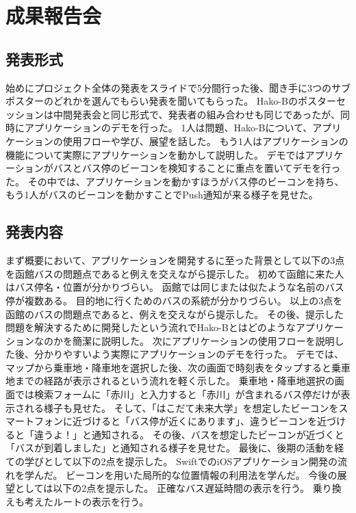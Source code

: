 \documentclass[openany,11pt,papersize]{jsbook}
\begin{document}

\section{成果報告会}
\subsection{発表形式}
始めにプロジェクト全体の発表をスライドで5分間行った後、聞き手に3つのサブポスターのどれかを選んでもらい発表を聞いてもらった。
Hako-Bのポスターセッションは中間発表会と同じ形式で、発表者の組み合わせも同じであったが、同時にアプリケーションのデモを行った。
1人は問題、Hako-Bについて、アプリケーションの使用フローや学び、展望を話した。
もう1人はアプリケーションの機能について実際にアプリケーションを動かして説明した。
デモではアプリケーションがバスとバス停のビーコンを検知することに重点を置いてデモを行った。
その中では、アプリケーションを動かすほうがバス停のビーコンを持ち、もう1人がバスのビーコンを動かすことでPush通知が来る様子を見せた。


\subsection{発表内容}
まず概要において、アプリケーションを開発するに至った背景として以下の3点を函館バスの問題点であると例えを交えながら提示した。
初めて函館に来た人はバス停名・位置が分かりづらい。
函館では同じまたは似たような名前のバス停が複数ある。
目的地に行くためのバスの系統が分かりづらい。
以上の3点を函館のバスの問題点であると、例えを交えながら提示した。
その後、提示した問題を解決するために開発したという流れでHako-Bとはどのようなアプリケーションなのかを簡潔に説明した。
次にアプリケーションの使用フローを説明した後、分かりやすいよう実際にアプリケーションのデモを行った。
デモでは、マップから乗車地・降車地を選択した後、次の画面で時刻表をタップすると乗車地までの経路が表示されるという流れを軽く示した。
乗車地・降車地選択の画面では検索フォームに「赤川」と入力すると「赤川」が含まれるバス停だけが表示される様子も見せた。
そして、「はこだて未来大学」を想定したビーコンをスマートフォンに近づけると「バス停が近くにあります」、違うビーコンを近づけると「違うよ！」と通知される。
その後、バスを想定したビーコンが近づくと「バスが到着しました」と通知される様子を見せた。
最後に、後期の活動を経ての学びとして以下の2点を提示した。
SwiftでのiOSアプリケーション開発の流れを学んだ。
ビーコンを用いた局所的な位置情報の利用法を学んだ。
今後の展望としては以下の2点を提示した。
正確なバス遅延時間の表示を行う。
乗り換えも考えたルートの表示を行う。
\end{document}
